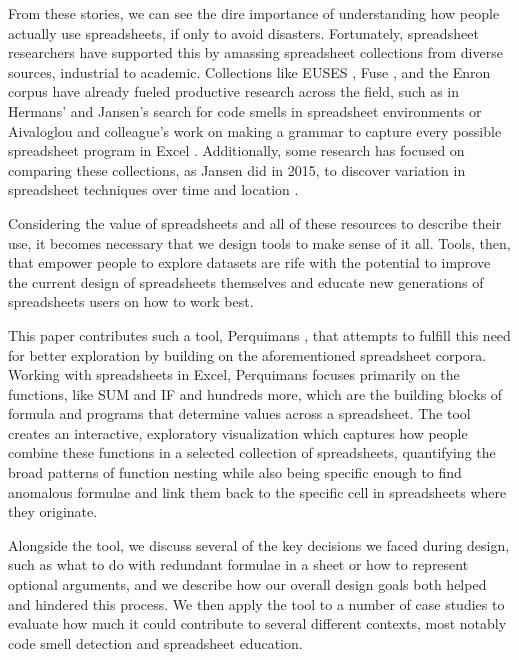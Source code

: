 \documentclass[conference]{IEEEtran}
\newcommand{\toolname}{Perquimans }
\begin{document}
	From these stories, we can see the dire importance of understanding how people
	actually use spreadsheets, if only to avoid disasters. Fortunately, spreadsheet
	researchers have supported this by amassing spreadsheet collections from
	diverse sources, industrial to academic. Collections like EUSES
	\cite{fisher2005euses}, Fuse \cite{barik2015fuse}, and the Enron corpus
	\cite{hermans2015enron} have already fueled productive research across the
	field, such as in Hermans' \cite{hermans2012detecting} and Jansen's
	\cite{jansen2015code} search for code smells in spreadsheet environments or
	Aivaloglou and colleague's work on making a grammar to capture every possible
	spreadsheet program in Excel \cite{aivaloglou2015grammar}. Additionally, some
	research has focused on comparing these collections, as Jansen did in
	2015, to discover variation in spreadsheet techniques over time and location
	\cite{jansen2015enron}.
	
	Considering the value of spreadsheets and all of these resources to
	describe their use, it becomes necessary that we design tools to make sense of
	it all. Tools, then, that empower people to explore datasets are rife with the
	potential to improve the current design of spreadsheets themselves and educate
	new generations of spreadsheets users on how to work best.
	
	This paper contributes such a tool, \toolname, that attempts to fulfill this
	need for better exploration by
	building on the aforementioned spreadsheet corpora. Working with spreadsheets
	in Excel, \toolname focuses primarily on the functions, like SUM and IF and
	hundreds more, which are the building blocks of formula and programs that
	determine values across a spreadsheet. The tool creates an interactive,
	exploratory visualization which captures how people combine these functions in
	a selected collection of spreadsheets, quantifying the broad patterns of
	function nesting while also being specific enough to find anomalous formulae
	and link them back to the specific cell in spreadsheets where they originate.
	\par
	
	Alongside the tool, we discuss several of the key decisions we faced during
	design, such as what to do with redundant formulae in a sheet or how to
	represent optional arguments, and we describe how our overall design goals both
	helped and hindered this process. We then apply the tool to a number of case
	studies to evaluate how much it could contribute to several different contexts,
	most notably code smell detection and spreadsheet education.
	
\end{document}
